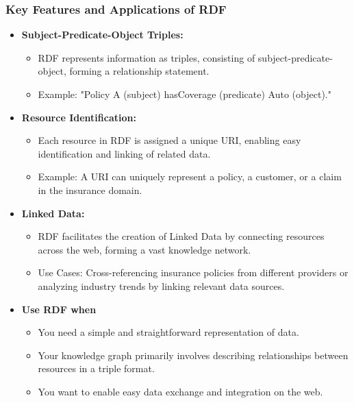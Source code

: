 \begin{frame}[fragile]
\frametitle{Key Features and Applications of RDF}
\begin{itemize}
\item \textbf{Subject-Predicate-Object Triples:}
\begin{itemize}
\item RDF represents information as triples, consisting of subject-predicate-object, forming a relationship statement.
\item Example: "Policy A (subject) hasCoverage (predicate) Auto (object)."
\end{itemize}

\item \textbf{Resource Identification:}
\begin{itemize}
\item Each resource in RDF is assigned a unique URI, enabling easy identification and linking of related data.
\item Example: A URI can uniquely represent a policy, a customer, or a claim in the insurance domain.
\end{itemize}

\item \textbf{Linked Data:}
\begin{itemize}
\item RDF facilitates the creation of Linked Data by connecting resources across the web, forming a vast knowledge network.
\item Use Cases: Cross-referencing insurance policies from different providers or analyzing industry trends by linking relevant data sources.
\end{itemize}

\item \textbf{Use RDF when}
\begin{itemize}
\item You need a simple and straightforward representation of data.
\item Your knowledge graph primarily involves describing relationships between resources in a triple format.
\item You want to enable easy data exchange and integration on the web.
\end{itemize}

\end{itemize}

\end{frame}

